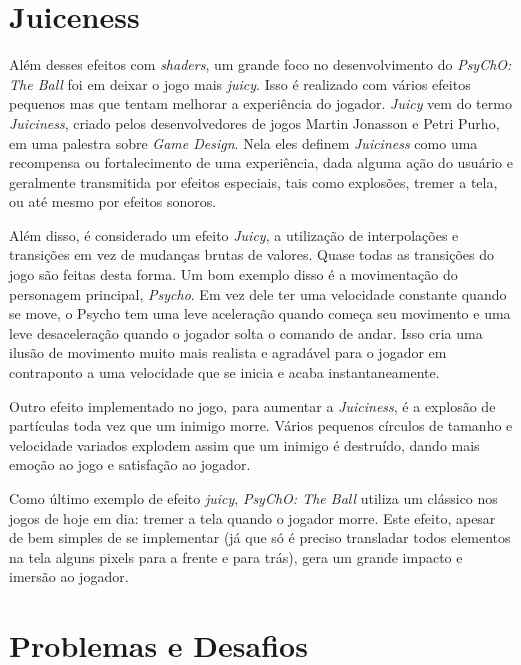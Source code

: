 
\section{Juiceness}
\label{sec:juiceness}

Além desses efeitos com \textit{shaders}, um grande foco no desenvolvimento do \textit{PsyChO: The Ball} foi em deixar o jogo mais \textit{juicy}. Isso é realizado com vários efeitos pequenos mas que tentam melhorar a experiência do jogador. \textit{Juicy} vem do termo \textit{Juiciness}, criado pelos desenvolvedores de jogos Martin Jonasson e Petri Purho, em uma palestra sobre \textit{Game Design}\cite{martinpetri}. Nela eles definem \textit{Juiciness} como uma recompensa ou fortalecimento de uma experiência, dada alguma ação do usuário e geralmente transmitida por efeitos especiais, tais como explosões, tremer a tela, ou até mesmo por efeitos sonoros.

Além disso, é considerado um efeito \textit{Juicy}, a utilização de interpolações e transições em vez de mudanças brutas de valores. Quase todas as transições do jogo são feitas desta forma. Um bom exemplo disso é a movimentação do personagem principal, \textit{Psycho}. Em vez dele ter uma velocidade constante quando se move, o Psycho tem uma leve aceleração quando começa seu movimento e uma leve desaceleração quando o jogador solta o comando de andar. Isso cria uma ilusão de movimento muito mais realista e agradável para o jogador em contraponto a uma velocidade que se inicia e acaba instantaneamente.

Outro efeito implementado no jogo, para aumentar a \textit{Juiciness}, é a explosão de partículas toda vez que um inimigo morre. Vários pequenos círculos de tamanho e velocidade variados explodem assim que um inimigo é destruído, dando mais emoção ao jogo e satisfação ao jogador.

Como último exemplo de efeito \textit{juicy}, \textit{PsyChO: The Ball} utiliza um clássico nos jogos de hoje em dia: tremer a tela quando o jogador morre. Este efeito, apesar de bem simples de se implementar (já que só é preciso transladar todos elementos na tela alguns pixels para a frente e para trás), gera um grande impacto e imersão ao jogador.

\section{Problemas e Desafios}
\label{sec:problemas_e_desafios}

